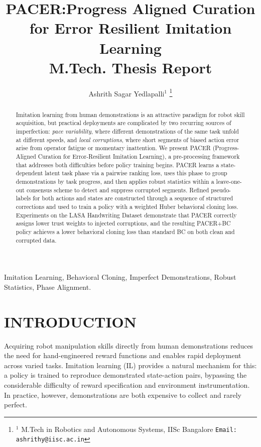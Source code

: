 \documentclass[a4paper, 10pt, conference]{ieeeconf}
\title{
    \LARGE \bf
    PACER:\@ Progress Aligned Curation \\ for Error Resilient Imitation Learning
    \\ [0.5em]
    \large M.Tech.\! Thesis Report
}
\author{
    Ashrith Sagar Yedlapalli$^{1}$
    \thanks{$^{1}$ M.Tech in Robotics and Autonomous Systems, IISc Bangalore
    {\tt\small Email: ashrithy@iisc.ac.in}}
}
\begin{document}
\maketitle
\thispagestyle{empty}
\pagestyle{empty}

\begin{abstract}

    Imitation learning from human demonstrations is an attractive paradigm for robot skill
    acquisition, but practical deployments are complicated by two recurring sources of
    imperfection: \emph{pace variability}, where different demonstrations of the same task
    unfold at different speeds, and \emph{local corruptions}, where short segments of biased
    action error arise from operator fatigue or momentary inattention.
    We present PACER (Progress-Aligned Curation for Error-Resilient Imitation Learning),
    a pre-processing framework that addresses both difficulties before policy training begins.
    PACER learns a state-dependent latent task phase via a pairwise ranking loss, uses this
    phase to group demonstrations by task progress, and then applies robust statistics within
    a leave-one-out consensus scheme to detect and suppress corrupted segments.
    Refined pseudo-labels for both actions and states are constructed through a sequence of
    structured corrections and used to train a policy with a weighted Huber behavioral cloning
    loss.
    Experiments on the LASA Handwriting Dataset demonstrate that PACER correctly assigns lower
    trust weights to injected corruptions, and the resulting PACER+BC policy achieves a lower
    behavioral cloning loss than standard BC on both clean and corrupted data.

\end{abstract}

\begin{keywords}
    Imitation Learning,
    Behavioral Cloning,
    Imperfect Demonstrations,
    Robust Statistics,
    Phase Alignment.
\end{keywords}

\section{INTRODUCTION}

Acquiring robot manipulation skills directly from human demonstrations reduces the need for hand-engineered reward functions and enables rapid deployment across varied tasks.
Imitation learning (IL) provides a natural mechanism for this: a policy is trained to reproduce demonstrated state-action pairs, bypassing the considerable difficulty of reward specification and environment instrumentation.
In practice, however, demonstrations are both expensive to collect and rarely perfect.
\end{document}

